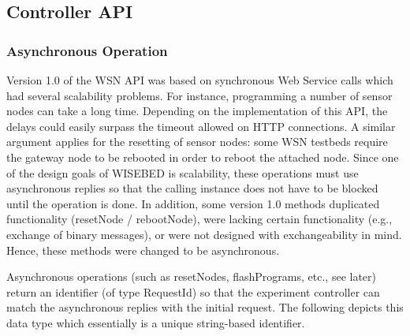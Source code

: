 \subsection{Controller API}

		\subsubsection{Asynchronous Operation}
Version 1.0 of the WSN API was based on synchronous Web Service calls which had several scalability problems. For instance, programming a number of sensor nodes can take a long time. Depending on the implementation of this API, the delays could easily surpass the timeout allowed on HTTP connections. A similar argument applies for the resetting of sensor nodes: some WSN testbeds require the gateway node to be rebooted in order to reboot the attached node. Since one of the design goals of WISEBED is scalability, these operations must use asynchronous replies so that the calling instance does not have to be blocked until the operation is done.  In addition, some version 1.0 methods duplicated functionality (resetNode / rebootNode), were lacking certain functionality (e.g., exchange of binary messages), or were not designed with exchangeability in mind. Hence, these methods were changed to be asynchronous.

Asynchronous operations (such as resetNodes, flashPrograms, etc., see later) return an identifier (of type RequestId) so that the experiment controller can match the asynchronous replies with the initial request. The following  depicts this data type which essentially is a unique string-based identifier.\\

